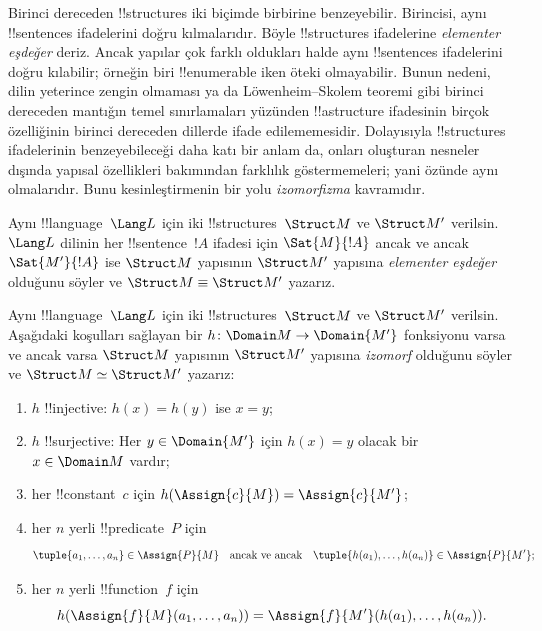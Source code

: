 


Birinci dereceden !!{structure}s iki biçimde birbirine benzeyebilir.
Birincisi, aynı !!{sentence}s ifadelerini doğru kılmalarıdır. Böyle
!!{structure}s ifadelerine \emph{elementer eşdeğer} deriz. Ancak yapılar
çok farklı oldukları halde aynı !!{sentence}s ifadelerini doğru
kılabilir; örneğin biri !!{enumerable} iken öteki olmayabilir. Bunun
nedeni, dilin yeterince zengin olmaması ya da Löwenheim--Skolem teoremi
gibi birinci dereceden mantığın temel sınırlamaları yüzünden
!!a{structure} ifadesinin birçok özelliğinin birinci dereceden dillerde
ifade edilememesidir. Dolayısıyla !!{structure}s ifadelerinin
benzeyebileceği daha katı bir anlam da, onları oluşturan nesneler
dışında yapısal özellikleri bakımından farklılık göstermemeleri; yani
özünde aynı olmalarıdır. Bunu kesinleştirmenin bir yolu
\emph{izomorfizma} kavramıdır.

\begin{defn}
Aynı !!{language}~$\Lang L$ için iki !!{structure}s~$\Struct M$ ve
$\Struct M'$ verilsin. $\Lang L$ dilinin her !!{sentence}~$!A$ ifadesi
için $\Sat{M}{!A}$ ancak ve ancak $\Sat{M'}{!A}$ ise $\Struct M$
yapısının $\Struct M'$ yapısına \emph{elementer eşdeğer} olduğunu
söyler ve $\Struct M\equiv\Struct M'$ yazarız.
\end{defn}

\begin{defn}
Aynı !!{language}~$\Lang L$ için iki !!{structure}s~$\Struct M$ ve
$\Struct M'$ verilsin. Aşağıdaki koşulları sağlayan bir
$h\colon\Domain M\to\Domain{M'}$ fonksiyonu varsa ve ancak varsa
$\Struct M$ yapısının $\Struct M'$ yapısına \emph{izomorf} olduğunu
söyler ve $\Struct M\simeq\Struct M'$ yazarız:
\begin{enumerate}
\item $h$ !!{injective}: $h(x)=h(y)$ ise $x=y$;
\item $h$ !!{surjective}: Her $y\in\Domain{M'}$ için $h(x)=y$ olacak
  bir $x\in\Domain M$ vardır;
\item {}her !!{constant}~$c$ için
  $h(\Assign{c}{M})=\Assign{c}{M'}$;
\item {}her $n$ yerli !!{predicate}~$P$ için
  \[
  \tuple{a_1, \dots, a_n}\in \Assign{P}{M} \quad\text{ancak ve ancak}\quad
  \tuple{h(a_1), \dots, h(a_n)} \in \Assign{P}{M'};
  \]
\item {}her $n$ yerli !!{function}~$f$ için
  \[
  h(\Assign{f}{M}(a_1, \dots, a_n)) =
  \Assign{f}{M'}(h(a_1), \dots, h(a_n)).
  \]
\end{enumerate}
\end{defn}

